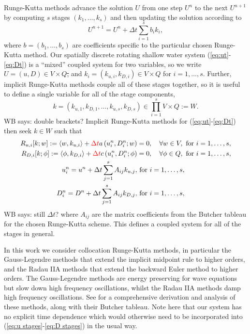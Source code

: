 \documentclass[a4paper, 12pt]{article}
\newcommand{\checkit}[1]{{\color{red}#1}}
\newcommand{\werner}[1]{{\color{magenta}WB says: #1}}
\begin{document}
Runge-Kutta methods advance the solution $U$ from one step $U^n$ to
the next $U^{n+1}$ by computing $s$ stages $(k_1,\ldots,k_s)$ and then
updating the solution according to
\begin{equation}
  U^{n+1} = U^n + \Delta t\sum_{i=1}^s b_i k_i,
\end{equation}
where $b=(b_1,\ldots, b_s)$ are coefficients specific to the
particular chosen Runge-Kutta method. Our spatially discrete rotating
shallow water system (\ref{eq:ut}-\ref{eq:Dt}) is a ``mixed'' coupled
system for two variables, so we write $U=(u,D)\in V\times Q$\st{,} and $k_i
= (k_{u,i},k_{D,i})\in V\times Q$ for $i=1,\ldots,s$. Further,
implicit Runge-Kutta methods couple all of these stages together, so it
is useful to define a single variable for all of the stage components,
\[
k = (k_{u,1},k_{D,1},\ldots,k_{u,s},k_{D,s}) \in
\prod_{i=1}^s V\times Q := W.
\]
\werner{double brackets?}
Implicit Runge-Kutta methods for (\ref{eq:ut}-\ref{eq:Dt}) then 
seek $k\in W$ such that
\begin{align}
    \label{eq:u stages}
    R_{u,i}[k;w] := \langle w, k_{u,i} \rangle + \checkit{\Delta t} a\left(
    u^n_i,D^n_i;w\right)
  & = 0,  
  \quad \forall w \in V,\mbox{ for }i=1,\ldots,s, \\
  \label{eq:D stages}
  R_{D,i}[k;\phi] := \langle \phi, k_{D,i} \rangle + \checkit{\Delta t} c\left(u^n_i,D^n_i; \phi\right)
  & = 0, \quad \forall \phi \in Q, \mbox{ for }i=1,\ldots,s,\\
  u^n_i = u^n + \Delta t\sum_{j=1}^sA_{ij}k_{u,j}, & \mbox{ for }i=1,\ldots,s,\\
  D^n_i = D^n + \Delta t\sum_{j=1}^sA_{ij}k_{D,j}, & \mbox{ for }i=1,\ldots,s,
\end{align}
\werner{still $\Delta t$?}
where $A_{ij}$ are the matrix coefficients from the Butcher
tableau for the chosen Runge-Kutta scheme. This defines a coupled
system for all of the stages in general.

In this work
we consider collocation Runge-Kutta methods, in particular the
Gauss-Legendre methods that extend the implicit midpoint rule to
higher orders, and the Radau IIA methods that extend the backward Euler
method to higher orders. The Gauss-Legendre methods are energy
preserving for wave equations but slow down high frequency
oscillations, whilst the Radau IIA methods damp high frequency
oscillations.  See \citet{wanner1996solving} for a comprehensive
derivation and analysis of these methods, along with their Butcher
tableau. Note here that our system has no explicit time dependence
which would otherwise need to be incorporated into (\ref{eq:u
  stages}-\ref{eq:D stages}) in the usual way.
\end{document}
